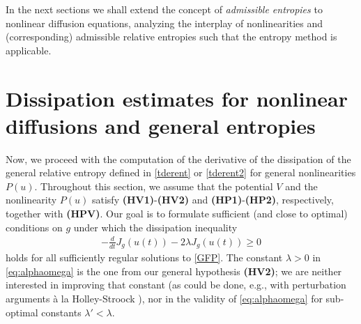 \documentclass[reqno]{amsart}
\begin{document}
In the next sections we shall extend the concept of \emph{admissible entropies} to nonlinear diffusion equations, analyzing the interplay of nonlinearities and (corresponding) admissible relative entropies such that the entropy method is applicable.


\section{Dissipation estimates for nonlinear diffusions and general entropies}\label{sec:BakEm}
\setcounter{equation}{0}
%
Now, we proceed with the computation of the derivative of the dissipation of the general relative entropy defined in \eqref{tderent} or \eqref{tderent2} for general nonlinearities $P(u)$.
Throughout this section, we assume that the potential $V$ and the nonlinearity $P(u)$ satisfy {\bf (HV1)}-{\bf (HV2)} and {\bf (HP1)}-{\bf (HP2)}, respectively, together with {\bf (HPV)}. 
Our goal is to formulate sufficient (and close to optimal) conditions on $g$ under which the dissipation inequality 
\begin{align}
  \label{eq:alphaomega}
  -\frac{d}{dt}J_g(u(t)) - 2\lambda J_g(u(t)) \ge 0
\end{align}
holds for all sufficiently regular solutions to \eqref{GFP}.
The constant $\lambda>0$ in \eqref{eq:alphaomega} is the one from our general hypothesis {\bf (HV2)};
we are neither interested in improving that constant (as could be done, e.g., with perturbation arguments \`a la Holley-Stroock \cite{HolSto87, AMTU}),
nor in the validity of \eqref{eq:alphaomega} for sub-optimal constants $\lambda'<\lambda$.
\end{document}
